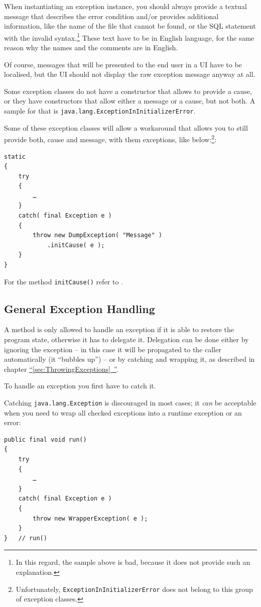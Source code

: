 \documentclass[11pt,a4paper, titlepage, parskip=half, headsepline, footsepline, cleardoublepage=current, headheight=1cm]{scrbook}
\newcommand*{\tqfullref}[1]{\hyperref[{#1}]{“\ref*{#1}~\nameref*{#1}”}}
\begin{document}
When instantiating an exception instance, you should always provide a textual message that describes the error condition and/or provides additional information, like the name of the file that cannot be found, or the SQL statement with the invalid syntax.\footnote{In this regard, the sample above is bad, because it does not provide such an explanation.} These text have to be in English language, for the same reason why the names and the comments are in English.

Of course, messages that will be presented to the end user in a UI have to be localised, but the UI should not display the raw exception message anyway at all.

Some exception classes do not have a constructor that allows to provide a cause, or they have constructors that allow either a message or a cause, but not both. A sample for that is \lstinline|java.lang.ExceptionInInitializerError|\autocite{ORACLE_DOC_EXCEPTIONININITIALIZERERROR_CLASS}.

Some of these exception classes will allow a workaround that allows you to still provide both, cause and message, with them exceptions, like below:\footnote{Unfortunately, \lstinline|ExceptionInInitializerError| does not belong to this group of exception classes.}: 
\begin{lstlisting}
static
{
    try
    {
        …    
    }
    catch( final Exception e )
    {
        throw new DumpException( "Message" )
            .initCause( e );    
    }
}
\end{lstlisting}

For the method \lstinline|initCause()| refer to \autocite{ORACLE_DOC_THROWABLE:initCause}.

\subsection{General Exception Handling}\label{sec:GeneralExceptionHandling}
A method is only allowed to handle an exception if it is able to restore the program state, otherwise it has to delegate it. Delegation can be done either by ignoring the exception – in this case it will be propagated to the caller automatically (it “bubbles up”) – or by catching and wrapping it, as described in chapter \tqfullref{sec:ThrowingExceptions}.

To handle an exception you first have to catch it.

Catching \lstinline|java.lang.Exception| is discouraged in most cases; it \textit{can} be acceptable when you need to wrap all checked exceptions into a runtime exception or an error:
\begin{lstlisting}
public final void run()
{
    try
    {
        …
    }
    catch( final Exception e )
    {
        throw new WrapperException( e );
    }
}   // run()
\end{lstlisting}
\end{document}
